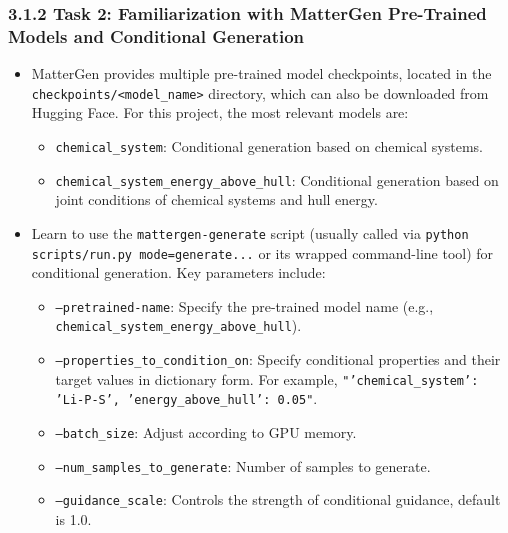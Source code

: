 \documentclass[letterpaper]{article} %
\begin{document}
\subsubsection{3.1.2 Task 2: Familiarization with MatterGen Pre-Trained Models and Conditional Generation}
\begin{itemize}
    \item MatterGen provides multiple pre-trained model checkpoints, located in the \texttt{checkpoints/<model\_name>} directory, which can also be downloaded from Hugging Face. For this project, the most relevant models are:
    \begin{itemize}
        \item \texttt{chemical\_system}: Conditional generation based on chemical systems.
        \item \texttt{chemical\_system\_energy\_above\_hull}: Conditional generation based on joint conditions of chemical systems and hull energy.
    \end{itemize}
    \item Learn to use the \texttt{mattergen-generate} script (usually called via \texttt{python scripts/run.py mode=generate...} or its wrapped command-line tool) for conditional generation. Key parameters include:
    \begin{itemize}
        \item \texttt{--pretrained-name}: Specify the pre-trained model name (e.g., \texttt{chemical\_system\_energy\_above\_hull}).
        \item \texttt{--properties\_to\_condition\_on}: Specify conditional properties and their target values in dictionary form. For example, \texttt{"{'chemical\_system': 'Li-P-S', 'energy\_above\_hull': 0.05}"}.
        \item \texttt{--batch\_size}: Adjust according to GPU memory.
        \item \texttt{--num\_samples\_to\_generate}: Number of samples to generate.
        \item \texttt{--guidance\_scale}: Controls the strength of conditional guidance, default is 1.0.
    \end{itemize}
\end{itemize}

\end{document}
